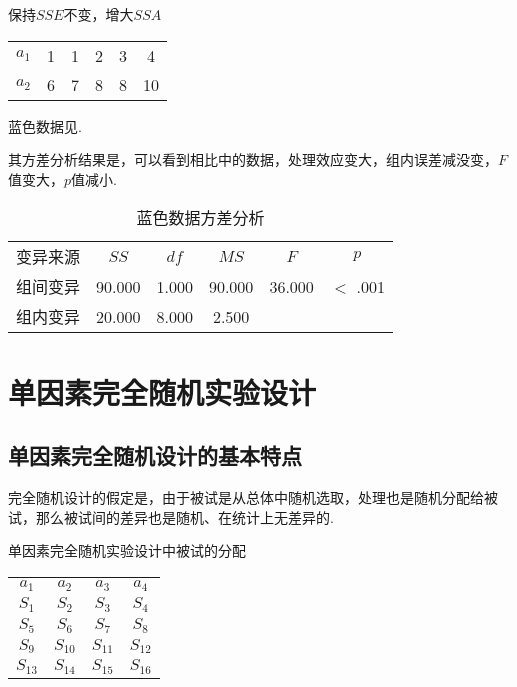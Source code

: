 \begin{margintable}
    \caption{保持$SSE$不变，增大$SSA$}
    \raggedright
    \begin{tabular}{cccccc}
        \hline
        $a_1$ & 1 & 1 & 2 & 3 & 4\\
        $a_2$ & 6 & 7 & 8 & 8 & 10\\
        \hline
    \end{tabular}
\end{margintable}

蓝色数据见.

其方差分析结果是，可以看到相比中的数据，处理效应变大，组内误差减没变，$F$值变大，$p$值减小.

\begin{table}[h]
	\centering
	\caption{蓝色数据方差分析}
	\label{tab:aNOVA-Score}
	{
		\begin{tabular}{cccccc}
			\toprule
			变异来源 & $SS$ & $df$ & $MS$ & $F$ & $p$  \\
			\cmidrule[0.4pt]{1-6}
			组间变异 & 90.000 & 1.000 & 90.000 & 36.000 & $<$ .001  \\
			组内变异 & 20.000 & 8.000 & 2.500 &  &    \\
			\bottomrule
		\end{tabular}
	}
\end{table}




\section{单因素完全随机实验设计}
\subsection{单因素完全随机设计的基本特点}

完全随机设计的假定是，由于被试是从总体中随机选取，处理也是随机分配给被试，那么被试间的差异也是随机、在统计上无差异的.

\begin{margintable}
	\centering
	\caption{单因素完全随机实验设计中被试的分配}
	{
		\begin{tabular}{cccc}
			\toprule
			$a_1$ & $a_2$ & $a_3$ & $a_4$ \\
			\cmidrule[0.4pt]{1-4}
			$S_1$ & $S_2$ & $S_3$ & $S_4$ \\
			$S_5$ & $S_6$ & $S_7$ & $S_8$ \\
			$S_9$ & $S_{10}$ & $S_{11}$ & $S_{12}$ \\
			$S_{13}$ & $S_{14}$ & $S_{15}$ & $S_{16}$ \\
			\bottomrule
		\end{tabular}
	}
\end{margintable}

